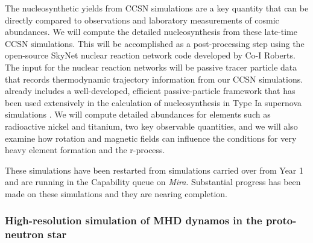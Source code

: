 \documentclass[12pt]{article}
\begin{document}
The nucleosynthetic yields from CCSN simulations are a key quantity that can be directly compared to observations and laboratory measurements of cosmic abundances.
We will compute the detailed nucleosynthesis from these late-time CCSN simulations.
This will be accomplished as a post-processing step using the open-source SkyNet nuclear reaction network code developed by Co-I Roberts.
The input for the nuclear reaction networks will be passive tracer particle data that records thermodynamic trajectory information from our \flash CCSN simulations.
\flash already includes a well-developed, efficient passive-particle framework that has been used extensively in the calculation of nucleosynthesis in Type Ia supernova simulations \citep[e.g.,][]{long:2014}.
We will compute detailed abundances for elements such as radioactive nickel and titanium, two key observable quantities, and we will also examine how rotation and magnetic fields can influence the conditions for very heavy element formation and the r-process.


These simulations have been restarted from simulations carried over from Year 1 and are running in the Capability queue on {\it Mira}. Substantial progress has been made on these simulations and they are nearing completion.

\subsubsection{High-resolution simulation of MHD dynamos in the proto-neutron star}
\end{document}

